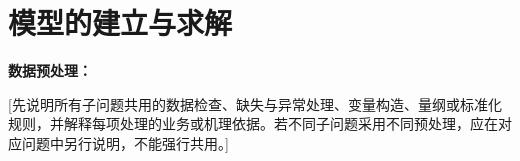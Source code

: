 \section{模型的建立与求解}

\noindent\textbf{数据预处理：}

[先说明所有子问题共用的数据检查、缺失与异常处理、变量构造、量纲或标准化规则，并解释每项处理的业务或机理依据。若不同子问题采用不同预处理，应在对应问题中另行说明，不能强行共用。]
